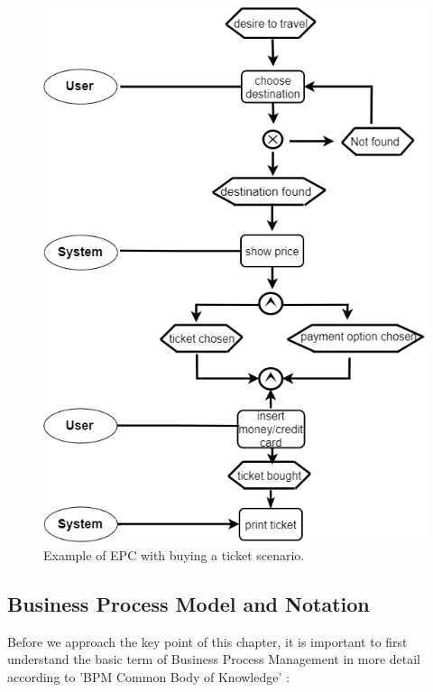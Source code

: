 \begin{figure}[!hb]
	\centering
	\includegraphics[scale=0.38]{EPC}
	\caption{Example of EPC with buying a ticket scenario.}
\end{figure}



\newpage
\subsection{Business Process Model and Notation}
Before we approach the key point of this chapter, it is important to first understand the basic term of Business Process Management in more detail according to 'BPM Common Body of Knowledge'  \cite{EUROPEANASSOCIATIONOFBPM.2009}:

